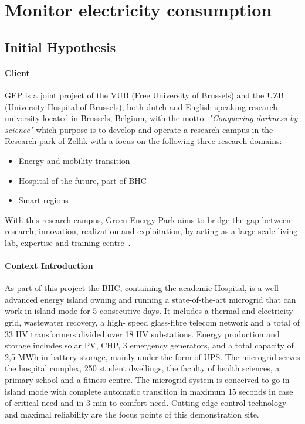 \section{Monitor electricity consumption}

\subsection{Initial Hypothesis}
\paragraph{Client} 
\ac{GEP} is a joint project of the \ac{VUB} (Free University of Brussels) and the \ac{UZB} (University Hospital of Brussels), both dutch and English-speaking research university located in Brussels, Belgium,
 with the motto: \textit{"Conquering darkness by science"} 
which purpose is to develop and operate a research campus in the Research park of Zellik with a focus on the following three research domains:
\begin{itemize}
    \item Energy and mobility transition
    \item Hospital of the future, part of \ac{BHC}
    \item Smart regions
\end{itemize}
With this research campus, Green Energy Park aims to bridge the gap between research, innovation, realization and exploitation, by acting as a large-scale living lab, expertise and training centre~\cite{Misc:vub_2020_green}.

\paragraph{Context Introduction}
As part of this project the \ac{BHC}, containing the academic Hospital, is a well-advanced
energy island owning and running a state-of-the-art microgrid that can work in island mode for
5 consecutive days. It includes a thermal and electricity grid, wastewater recovery, a high-
speed glass-fibre telecom network and a total of 33 \ac{HV} transformers divided over 18 \ac{HV} substations. 
Energy production and storage includes solar PV, CHP, 3 emergency generators,
and a total capacity of 2,5 MWh in battery storage, mainly under the form of UPS.
The microgrid serves the hospital complex, 250 student dwellings, the faculty of health
sciences, a primary school and a fitness centre. The microgrid system is conceived to go in
island mode with complete automatic transition in maximum 15 seconds in case of critical need
and in 3 min to comfort need. Cutting edge control
technology and maximal reliability are the focus points of this demonstration site.

